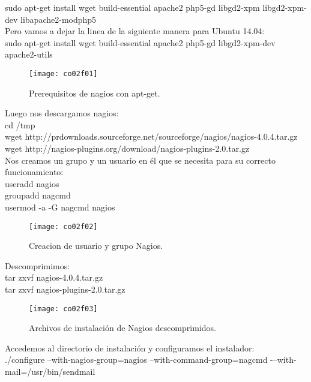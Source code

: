 sudo apt-get install wget build-essential apache2 php5-gd libgd2-xpm libgd2-xpm-dev libapache2-modphp5\\

Pero vamos a dejar la linea de la siguiente manera para Ubuntu 14.04:\\

sudo apt-get install wget build-essential apache2 php5-gd libgd2-xpm-dev apache2-utils\\

\begin{figure}[H]
	\centering
	\texttt{[image: co02f01]}
	\caption{Prerequisitos de nagios con apt-get.}
	\label{fig:co02f01}
\end{figure}

Luego nos descargamos nagios:\\
cd /tmp\\
wget http://prdownloads.sourceforge.net/sourceforge/nagios/nagios-4.0.4.tar.gz\\
wget http://nagios-plugins.org/download/nagios-plugins-2.0.tar.gz\\

Nos creamos un grupo y un usuario en él que se necesita para su correcto funcionamiento:\\
useradd nagios\\
groupadd nagcmd\\
usermod -a -G nagcmd nagios\\

\begin{figure}[H]
	\centering
	\texttt{[image: co02f02]}
	\caption{Creacion de usuario y grupo Nagios.}
	\label{fig:co02f02}
\end{figure}

Descomprimimos:\\
tar zxvf nagios-4.0.4.tar.gz\\
tar zxvf nagios-plugins-2.0.tar.gz\\

\begin{figure}[H]
	\centering
	\texttt{[image: co02f03]}
	\caption{Archivos de instalación de Nagios descomprimidos.}
	\label{fig:co02f03}
\end{figure}

Accedemos al directorio de instalación y configuramos el instalador:\\

./configure --with-nagios-group=nagios --with-command-group=nagcmd -–with-mail=/usr/bin/sendmail\\

